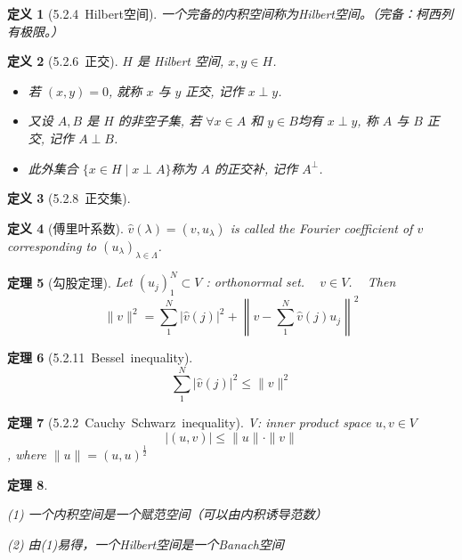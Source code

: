 \documentclass[10pt,openany]{book}
\theoremstyle{thmstyle} %
\newtheorem{theorem}{定理}[chapter]
\theoremstyle{defstyle} %
\newtheorem{definition}[theorem]{定义}
\theoremstyle{prostyle} %
\begin{document}
\begin{definition}[5.2.4~Hilbert空间] 
一个完备的内积空间称为Hilbert空间。（完备：柯西列有极限。）
\end{definition}


\begin{definition}[5.2.6~正交] 
$H$ 是 Hilbert 空间, $x, y \in H$. 
\begin{itemize}
    \item[(1)] 若 $(x, y)=0$, 就称 $x$ 与 $y$ 正交, 记作 $x \perp y$. 
    \item[(2)] 又设 $A, B$ 是 $H$ 的非空子集, 若 $\forall x \in A$ 和 $y \in B$均有 $x \perp y$, 称 $A$ 与 $B$ 正交, 记作 $A \perp B$. 
    \item[(3)] 此外集合 $\{x \in H \mid x \perp A\}$称为 $A$ 的正交补, 记作 $A^{\perp}$.
\end{itemize}
\end{definition}



\begin{definition}[5.2.8~正交集] 

\end{definition}

\begin{definition}[傅里叶系数]
$ \hat{v}(\lambda) = (v,u_{\lambda}) $ is called the Fourier coefficient of $v$ corresponding to $(u_{\lambda})_{\lambda \in \Lambda}$.
\end{definition}


\begin{theorem}[勾股定理]
Let $\left(u_j\right)_{1}^{N} \subset V$ : orthonormal set. ~ $v \in V$. ~ Then 
$$
\|v\|^2=\sum\limits_1^N |\hat{v}(j)|^2 + \left\|v-\sum\limits_1^N \hat{v}(j) u_j\right\|^2
$$
\end{theorem}



\begin{theorem}[5.2.11~Bessel~inequality]
$$
\sum\limits_1^N |\hat{v}(j)|^2 \leq \|v\|^2
$$
\end{theorem}

\begin{theorem}[5.2.2~Cauchy~Schwarz~inequality] 
V: inner product space $u, v \in V$
$$
|(u, v)| \leqslant\|u\| \cdot\|v\|
$$, 
where $\|u\|=(u, u)^{\frac{1}{2}}$
\end{theorem}

\begin{theorem} \

(1) 一个内积空间是一个赋范空间（可以由内积诱导范数）

(2) 由(1)易得，一个Hilbert空间是一个Banach空间
\end{theorem}
\end{document}
